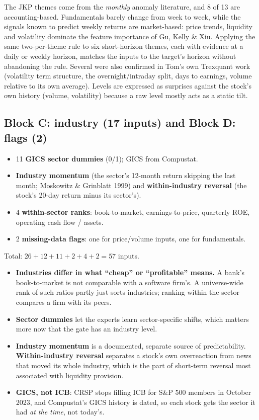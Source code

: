 \begin{whybox}
The JKP themes come from the \emph{monthly} anomaly literature, and 8 of 13 are accounting-based.
Fundamentals barely change from week to week, while the signals known to predict weekly returns are
market-based: price trends, liquidity and volatility dominate the feature importance of Gu, Kelly \& Xiu.
Applying the same two-per-theme rule to six short-horizon themes, each with evidence at a daily or weekly
horizon, matches the inputs to the target's horizon without abandoning the rule. Several were also
confirmed in Tom's own Trexquant work (volatility term structure, the overnight/intraday split, days to
earnings, volume relative to its own average). Levels are expressed as surprises against the stock's own
history (volume, volatility) because a raw level mostly acts as a static tilt.
\end{whybox}

\subsection{Block C: industry (17 inputs) and Block D: flags (2)}

\begin{itemize}
\item 11 \textbf{GICS sector dummies} (0/1);  GICS from Compustat.
\item \textbf{Industry momentum} (the sector's 12-month return skipping the last month; Moskowitz \&
  Grinblatt 1999) and \textbf{within-industry reversal} (the stock's 20-day return minus its sector's).
\item 4 \textbf{within-sector ranks}: book-to-market, earnings-to-price, quarterly ROE, operating cash
  flow / assets.
\item 2 \textbf{missing-data flags}: one for price/volume inputs, one for fundamentals.
\end{itemize}
Total: $26+12+11+2+4+2=57$ inputs.

\begin{whybox}
\begin{itemize}
\item \textbf{Industries differ in what ``cheap'' or ``profitable'' means.} A bank's book-to-market is not
  comparable with a software firm's. A universe-wide rank of such ratios partly just sorts industries;
  ranking within the sector compares a firm with its peers.
\item \textbf{Sector dummies} let the experts learn sector-specific shifts, which matters more now that the gate
  has an industry level.
\item \textbf{Industry momentum} is a documented, separate source of predictability. \textbf{Within-industry
  reversal} separates a stock's own overreaction from news that moved its whole industry, which is the
  part of short-term reversal most associated with liquidity provision.
\item \textbf{GICS, not ICB}: CRSP stops filling ICB for S\&P 500 members in October 2023, and Compustat's
  GICS history is dated, so each stock gets the sector it had \emph{at the time}, not today's.
\end{itemize}
\end{whybox}

